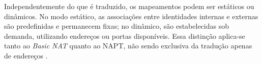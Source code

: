 Independentemente do que é traduzido, os mapeamentos podem ser estáticos ou dinâmicos. No modo estático, as associações entre identidades internas e externas são predefinidas e permanecem fixas; no dinâmico, são estabelecidas sob demanda, utilizando endereços ou portas disponíveis. Essa distinção aplica-se tanto ao \textit{Basic NAT} quanto ao NAPT, não sendo exclusiva da tradução apenas de endereços \citep{RFC3022}.

